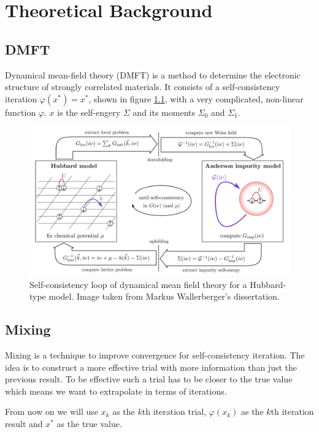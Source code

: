 \chapter{Theoretical Background}
\label{ch:background}

\section{DMFT}
Dynamical mean-field theory (DMFT)\cite{dmft} is a method to determine the electronic structure of strongly correlated materials. It consists of a self-consistency iteration \(\varphi(x^\ast) = x^\ast\), shown in figure \ref{fig:dmft}, with a very complicated, non-linear function \(\varphi\). $x$ is the self-engery $\Sigma$ and its moments $\Sigma_0$ and $\Sigma_1$.

\begin{figure}[H]
    \centering
    \includegraphics[width=1.0\textwidth]{figures/dmft.png}
    \caption{Self-consistency loop of dynamical mean field theory for a Hubbard-type model. Image taken from Markus Wallerberger's dissertation.\cite{wallerberger2016}}
    \label{fig:dmft}
\end{figure}

\section{Mixing}
Mixing is a technique to improve convergence for self-consistency iteration. The idea is to construct a more effective trial with more information than just the previous result. To be effective such a trial has to be closer to the true value which means we want to extrapolate in terms of iterations.

From now on we will use $x_k$ as the $k$th iteration trial, $\varphi(x_k)$ as the $k$th iteration result and $x^\ast$ as the true value.

